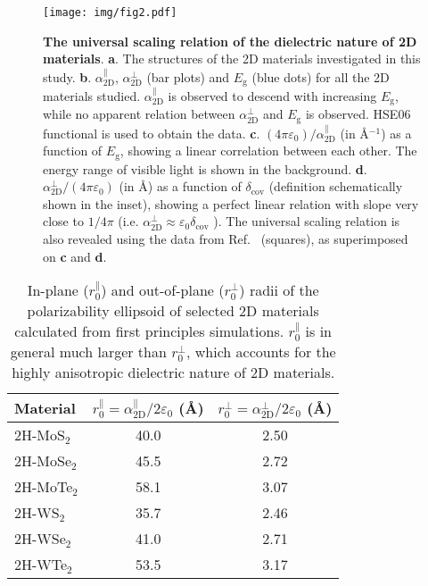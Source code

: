 \documentclass[journal=ancac3,manuscript=article,email=true,hyperref=true,keywords=false]{achemso}
\begin{document}
\begin{figure}[H]
\centering
\texttt{[image: img/fig2.pdf]}
\caption{\label{fig-3} \textbf{The universal scaling relation of the
    dielectric nature of 2D materials}. \textbf{a}. The structures of
  the 2D materials investigated in this
  study. \textbf{b}. $\alpha_{\mathrm{2D}}^{\parallel}$,
  $\alpha_{\mathrm{2D}}^{\perp}$ (bar plots) and $E_{\mathrm{g}}$
  (blue dots) for all the 2D materials studied.
  $\alpha_{\mathrm{2D}}^{\parallel}$ is observed to descend with
  increasing $E_{\mathrm{g}}$, while no apparent relation between
  $\alpha_{\mathrm{2D}}^{\perp}$ and $E_{\mathrm{g}}$ is
  observed. HSE06 functional is used to obtain the data. \textbf{c}.
  $(4\pi \varepsilon_{0})/\alpha_{\mathrm{2D}}^{\parallel}$ (in
  \AA{}$^{-1}$) as a function of $E_{\mathrm{g}}$, showing a linear
  correlation between each other. The energy range of visible light is
  shown in the background. \textbf{d}.
  $\alpha_{\mathrm{2D}}^{\perp}/(4\pi\varepsilon_{0})$ (in \AA{}) as a
  function of $\delta_{\mathrm{cov}}$ (definition schematically shown
  in the inset), showing a perfect linear relation with slope very
  close to $1/4\pi$ (i.e.
  $\alpha_{\mathrm{2D}}^{\perp} \approx \varepsilon_{0}
  \delta_{\mathrm{cov}}$ ). The universal scaling relation is also
  revealed using the data from Ref.~ (squares),
  as superimposed on \textbf{c} and \textbf{d}.}
\end{figure}


\begin{table}[H]
  \centering
  \caption{In-plane ($r_{0}^{\parallel}$) and out-of-plane
    ($r_{0}^{\perp}$) radii of the polarizability ellipsoid of
    selected 2D materials calculated from first principles
    simulations. $r_{0}^{\parallel}$ is in general much larger than
    $r_{0}^{\perp}$, which accounts for the highly anisotropic
    dielectric nature of 2D materials.}
  \label{tbl:radii}  
  \begin{tabular}{lcc}
    \hline
    Material & $r_{0}^{\parallel} = \alpha_{\mathrm{2D}}^{\parallel}/2\varepsilon_{0}$ (\AA{}) &  $r_{0}^{\perp} = \alpha_{\mathrm{2D}}^{\perp}/2\varepsilon_{0}$ (\AA{})\\
    \hline
    2H-MoS$_{2}$ & 40.0 & 2.50 \\
    2H-MoSe$_{2}$ & 45.5 & 2.72  \\
    2H-MoTe$_{2}$ & 58.1 & 3.07  \\
    2H-WS$_{2}$ & 35.7 & 2.46  \\
    2H-WSe$_{2}$ & 41.0 & 2.71 \\
    2H-WTe$_{2}$ & 53.5 &  3.17\\
    \hline
  \end{tabular}
\end{table}
\end{document}
